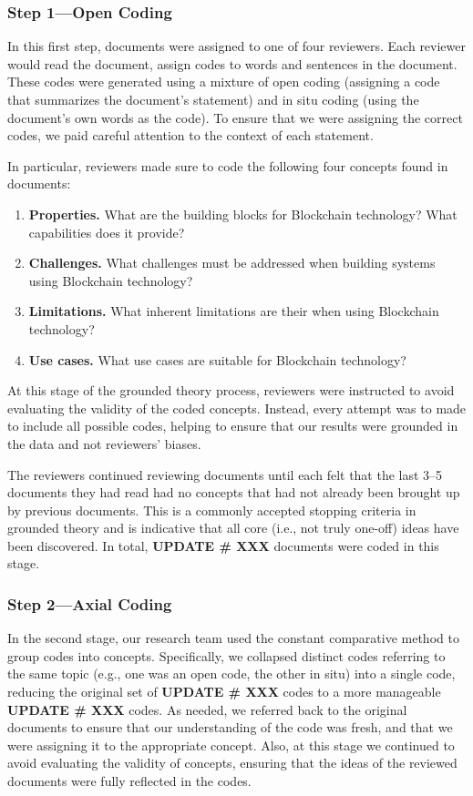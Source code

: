 \subsubsection{Step 1---Open Coding}
In this first step, documents were assigned to one of four reviewers.
Each reviewer would read the document, assign codes to words and sentences in the document.
These codes were generated using a mixture of open coding (assigning a code that summarizes the document's statement) and in situ coding (using the document's own words as the code).
To ensure that we were assigning the correct codes, we paid careful attention to the context of each statement.

In particular, reviewers made sure to code the following four concepts found in documents:
\begin{enumerate}
	\item \textbf{Properties.} What are the building blocks for Blockchain technology? What capabilities does it provide?
	\item \textbf{Challenges.} What challenges must be addressed when building systems using Blockchain technology?
	\item \textbf{Limitations.} What inherent limitations are their when using Blockchain technology?
	\item \textbf{Use cases.} What use cases are suitable for Blockchain technology?
\end{enumerate}

At this stage of the grounded theory process, reviewers were instructed to avoid evaluating the validity of the coded concepts.
Instead, every attempt was to made to include all possible codes, helping to ensure that our results were grounded in the data and not reviewers' biases.

The reviewers continued reviewing documents until each felt that the last 3--5 documents they had read had no concepts that had not already been brought up by previous documents.
This is a commonly accepted stopping criteria in grounded theory and is indicative that all core (i.e., not truly one-off) ideas have been discovered.
In total, \textbf{UPDATE \# XXX} documents were coded in this stage.

\subsubsection{Step 2---Axial Coding}
In the second stage, our research team used the constant comparative method to group codes into concepts.
Specifically, we collapsed distinct codes referring to the same topic (e.g., one was an open code, the other in situ) into a single code, reducing the original set of \textbf{UPDATE \# XXX} codes to a more manageable \textbf{UPDATE \# XXX} codes.
As needed, we referred back to the original documents to ensure that our understanding of the code was fresh, and that we were assigning it to the appropriate concept.
Also, at this stage we continued to avoid evaluating the validity of concepts, ensuring that the ideas of the reviewed documents were fully reflected in the codes.

